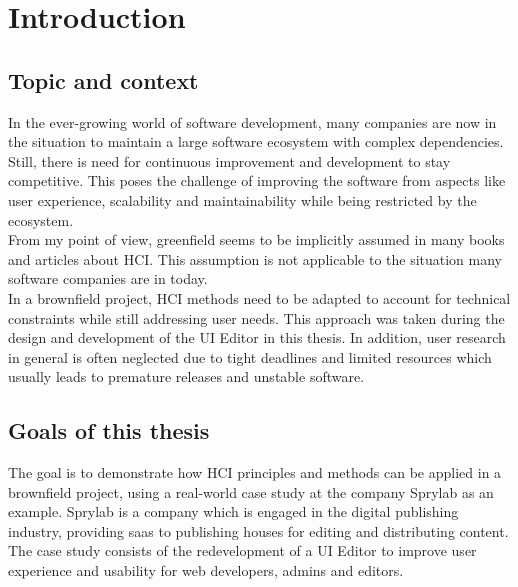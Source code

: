 %
\chapter{Introduction}
\label{chap:introduction}

\section{Topic and context}

In the ever-growing world of software development, many companies are now in the situation to maintain a large software ecosystem with complex dependencies.
Still, there is need for continuous improvement and development to stay competitive.
This poses the challenge of improving the software from aspects like user experience, scalability and maintainability while being restricted by the ecosystem.
\\
From my point of view, \Gls{greenfield} seems to be implicitly assumed in many books and articles about HCI.
This assumption is not applicable to the situation many software companies are in today.
\\
In a brownfield project, HCI methods need to be adapted to account for technical constraints while still addressing user needs. This approach was taken during the design and development of the UI Editor in this thesis.
In addition, user research in general is often neglected due to tight deadlines and limited resources which usually leads to premature releases and unstable software.
\section{Goals of this thesis}
The goal is to demonstrate how HCI principles and methods can be applied in a brownfield project, using a real-world case study at the company Sprylab as an example.
Sprylab is a company which is engaged in the digital publishing industry, providing \Gls{saas} to publishing houses for editing and distributing content.
The case study consists of the redevelopment of a UI Editor to improve user experience and usability for web developers, admins and editors.

